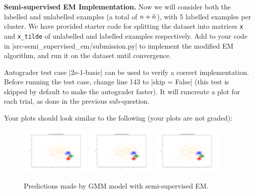 \item {}
\textbf{Semi-supervised EM Implementation.}
Now we will consider both the labelled and unlabelled examples (a total of ${n} + \tilde{{n}}$), with 5 labelled examples per cluster. We have provided starter code for splitting the dataset into matrices \texttt{x} and \texttt{x\_tilde} of unlabelled and labelled examples respectively. Add to your code in |src-semi_supervised_em/submission.py| to implement the modified EM algorithm, and run it on the dataset until convergence.

Autograder test case |2e-1-basic| can be used to verify a correct implementation.  Before running the test case, change line 143 to |skip = False| (this test is skipped by default to make the autograder faster).  It will runcreate a plot for each trial, as done in the previous sub-question.

Your plots should look similar to the following (your plots are not graded):

  \begin{figure}[H]
    \centering
    \includegraphics[width=0.3\textwidth]{02-semi_supervised_em/pred_ss_0.pdf}
    \includegraphics[width=0.3\textwidth]{02-semi_supervised_em/pred_ss_1.pdf}
    \includegraphics[width=0.3\textwidth]{02-semi_supervised_em/pred_ss_2.pdf}
    \caption{Predictions made by GMM model with semi-supervised EM.}
  \end{figure}
